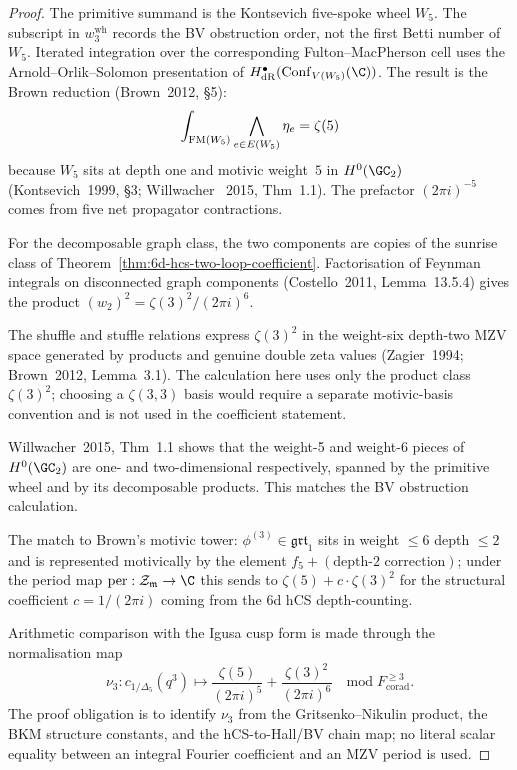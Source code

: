 \begin{proof}
The primitive summand is the Kontsevich five-spoke wheel \(W_{5}\).
The subscript in \(w_3^{\mathrm{wh}}\) records the BV obstruction
order, not the first Betti number of \(W_{5}\).
Iterated integration over the corresponding Fulton--MacPherson cell
uses the Arnold--Orlik--Solomon presentation of
\(H^\bullet_\DR(\Conf_{V(W_5)}(\C))\).
The result is the Brown reduction
(Brown~2012, \S5):
\[
\int_{\mathrm{FM}(W_5)}\bigwedge_{e\in E(W_5)} \eta_e
= \zeta(5)
\]
because \(W_{5}\) sits at depth one and motivic weight~$5$ in
$H^0(\GC_2)$ (Kontsevich~1999, \S3; Willwacher~
2015, Thm~1.1). The prefactor $(2\pi i)^{-5}$ comes from five
net propagator contractions.

For the decomposable graph class, the two components are copies of the
sunrise class of Theorem~\ref{thm:6d-hcs-two-loop-coefficient}.
Factorisation of Feynman integrals on disconnected graph components
(Costello~2011, Lemma~13.5.4) gives the product
$(w_2)^2 = \zeta(3)^2/(2\pi i)^6$.

The shuffle and stuffle relations express $\zeta(3)^2$ in the
weight-six depth-two MZV space generated by products and genuine
double zeta values (Zagier~1994; Brown~2012, Lemma~3.1). The
calculation here uses only the product class
$\zeta(3)^2$; choosing a $\zeta(3,3)$ basis would require a separate
motivic-basis convention and is not used in the coefficient statement.

Willwacher~2015, Thm~1.1 shows that the weight-5 and weight-6 pieces
of $H^0(\GC_2)$ are one- and two-dimensional respectively, spanned
by the primitive wheel and by its decomposable products. This
matches the BV obstruction calculation.

The match to Brown's motivic tower: $\phi^{(3)} \in \mathfrak{grt}_1$
sits in weight $\leq 6$ depth $\leq 2$ and is represented motivically
by the element $f_5 + (\text{depth-}2\text{ correction})$; under the
period map $\mathrm{per}:\MMZV\to \C$ this sends to
$\zeta(5) + c\cdot \zeta(3)^2$ for the structural coefficient
$c = 1/(2\pi i)$ coming from the 6d hCS depth-counting.

Arithmetic comparison with the Igusa cusp form is made through the
normalisation map
\[
 \nu_3\colon c_{1/\Delta_5}(q^3)
 \longmapsto
 \frac{\zeta(5)}{(2\pi i)^5}
 + \frac{\zeta(3)^2}{(2\pi i)^6}
 \quad \mathrm{mod}\;F_{\mathrm{corad}}^{\ge 3}.
\]
The proof obligation is to identify $\nu_3$ from the
Gritsenko--Nikulin product, the BKM structure constants, and the
hCS-to-Hall/BV chain map; no literal scalar equality between an integral
Fourier coefficient and an MZV period is used.
\end{proof}

